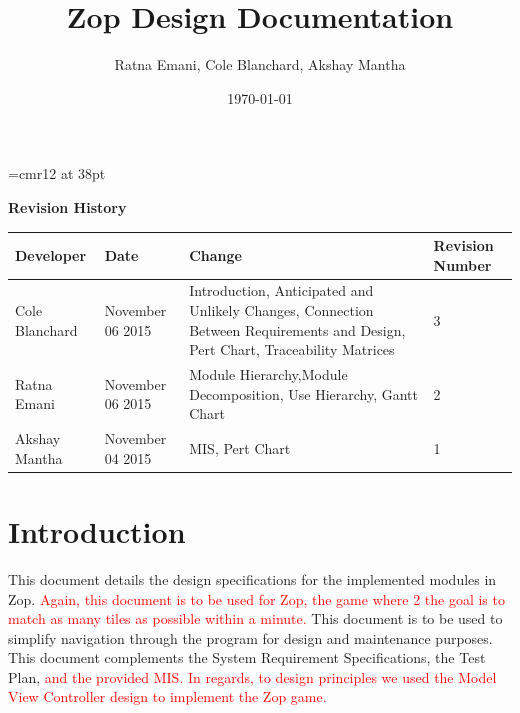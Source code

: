 \documentclass[12pt]{article}
\begin{document}
\begin{titlepage}
\font\myfont=cmr12 at 38pt
\title{\myfont\vspace{60mm}Zop Design Documentation} 
\author{Ratna Emani, Cole Blanchard, Akshay Mantha}
\date{\today}
\maketitle

\end{titlepage}
\newpage
\textbf{Revision History}\\
\begin{center}
 \begin{tabular}{|C{3cm}|C{3cm}|C{3cm}|C{3cm}|}
 \hline
 \textbf{Developer} & \textbf{Date} & \textbf{Change} & \textbf{Revision Number}\\
 \hline \hline
 Cole Blanchard & November 06 2015 & Introduction, \newline Anticipated and Unlikely Changes, \newline Connection Between Requirements and Design, \newline Pert Chart, \newline Traceability Matrices & 3\\
 \hline
 Ratna Emani & November 06 2015 & Module Hierarchy,\newline Module Decomposition, \newline Use Hierarchy, \newline Gantt Chart & 2\\
 \hline
 Akshay Mantha & November 04 2015 & MIS, \newline Pert Chart & 1\\
 \hline
 \end{tabular}
\end{center}

\newpage
\tableofcontents
\newpage


\section{Introduction}
This document details the design specifications for the implemented modules in Zop. \textcolor{red}{  Again, this document is to be used for Zop, the game where 2 the goal is to match as many tiles as possible within a minute.}  This document is to be used to simplify navigation through the program for design and maintenance purposes.  This document complements the System Requirement Specifications, the Test Plan, \textcolor{red}{ and the provided MIS.} \textcolor{red}{In regards, to design principles we used the Model View Controller design to implement the Zop game.}
\end{document}
